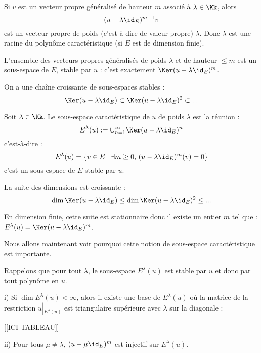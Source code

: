 \documentclass[class=report,crop=false]{standalone}
\newcommand{\Res}[1]{{\left | {}_{#1} \right.}}
\begin{document}
\begin{remarque*}


Si $v$ est un vecteur propre généralisé de hauteur $m$ associé à $\lambda \in \Kk$, alors \[(u-\lambda\id_E)^{m-1}v\] est un vecteur propre de poids (c'est-à-dire de valeur propre)  $\lambda$. Donc $\lambda$ est une racine du polynôme caractéristique (si $E$ est de dimension finie).
\end{remarque*}

\begin{exercicecours}[important]
L'ensemble des vecteurs propres généralisés de poids $\lambda$ et de hauteur $\le m$ est un sous-espace de $E$, stable par $u$ : c'est exactement $\Ker(u-\lambda\id_E)^m$.  
\end{exercicecours}

On a une cha\^ine croissante de sous-espaces stables :
\[\Ker(u-\lambda\id_E) \subset \Ker(u-\lambda\id_E)^2 \subset ...  \]

\begin{definition}
Soit $\lambda \in \Kk$. 
Le sous-espace caractéristique  de $u$ de poids $\lambda$ est la réunion :
\[E^\lambda(u):= \cup_{n=1}^\infty \Ker(u-\lambda\id_E)^n\]
c'est-à-dire :
\[E^\lambda(u) = \{v \in E \mid \exists m \ge 0,\, (u-\lambda\id_E)^m(v) =0\} \]
c'est un sous-espace de $E$ stable par $u$.
\end{definition}

\begin{remarque*}

La suite des dimensions est croissante :
\[ \dim \Ker(u-\lambda\id_E) \le \dim \Ker(u-\lambda\id_E)^2 \le ...\]

En dimension finie, cette suite est stationnaire donc il existe un entier $m$ tel que : $E^\lambda(u) =\Ker(u-\lambda\id_E)^m$.

\end{remarque*}

Nous allons maintenant voir pourquoi cette notion de sous-espace caractéristique
est importante.

Rappelons que pour tout $\lambda$, le sous-espace $E^\lambda(u)$ est stable par $u$ et donc par tout polynôme en $u$.

\begin{lemme}
i) Si $\dim E^\lambda(u) < \infty$, alors il existe une base de $E^\lambda(u)$ où la matrice de la restriction $u\Res{E^\lambda(u)}$ est triangulaire supérieure avec $\lambda$ sur la diagonale :

[[ICI TABLEAU]]


ii) Pour tous $\mu \neq \lambda$, $(u-\mu\id_E)^m$ est injectif sur $E^\lambda(u)$.
\end{lemme}
\end{document}
